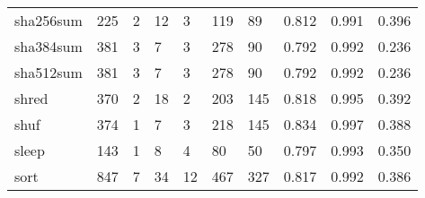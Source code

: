 \begin{longtable}{lp{2.0cm}p{2.0cm}p{2.0cm}p{2.0cm}p{2.0cm}p{2.0cm}p{2.0cm}p{2.0cm}p{2.0cm}}
sha256sum &                    225 &                                  2 &                                12 &                                3 &                               119 &                              89 &                                   0.812 &                                  0.991 &                                0.396 \\
sha384sum &                    381 &                                  3 &                                 7 &                                3 &                               278 &                              90 &                                   0.792 &                                  0.992 &                                0.236 \\
sha512sum &                    381 &                                  3 &                                 7 &                                3 &                               278 &                              90 &                                   0.792 &                                  0.992 &                                0.236 \\
shred     &                    370 &                                  2 &                                18 &                                2 &                               203 &                             145 &                                   0.818 &                                  0.995 &                                0.392 \\
shuf      &                    374 &                                  1 &                                 7 &                                3 &                               218 &                             145 &                                   0.834 &                                  0.997 &                                0.388 \\
sleep     &                    143 &                                  1 &                                 8 &                                4 &                                80 &                              50 &                                   0.797 &                                  0.993 &                                0.350 \\
sort      &                    847 &                                  7 &                                34 &                               12 &                               467 &                             327 &                                   0.817 &                                  0.992 &                                0.386 \\

\end{longtable}
